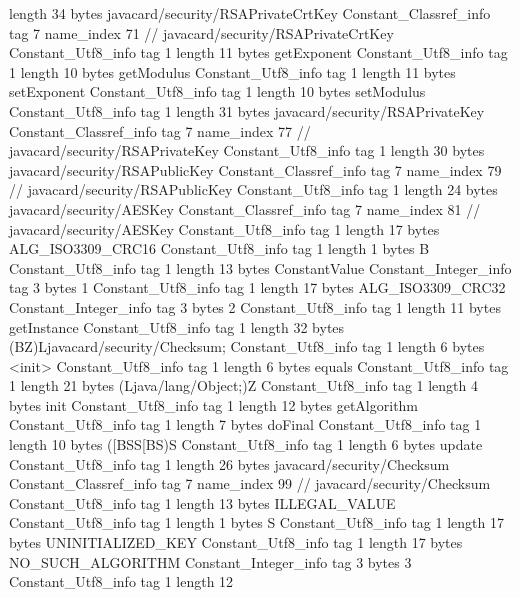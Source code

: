 {{{			length	34
			bytes	javacard/security/RSAPrivateCrtKey
		}
		Constant_Classref_info {
			tag	7
			name_index	71		// javacard/security/RSAPrivateCrtKey
		}
		Constant_Utf8_info {
			tag	1
			length	11
			bytes	getExponent
		}
		Constant_Utf8_info {
			tag	1
			length	10
			bytes	getModulus
		}
		Constant_Utf8_info {
			tag	1
			length	11
			bytes	setExponent
		}
		Constant_Utf8_info {
			tag	1
			length	10
			bytes	setModulus
		}
		Constant_Utf8_info {
			tag	1
			length	31
			bytes	javacard/security/RSAPrivateKey
		}
		Constant_Classref_info {
			tag	7
			name_index	77		// javacard/security/RSAPrivateKey
		}
		Constant_Utf8_info {
			tag	1
			length	30
			bytes	javacard/security/RSAPublicKey
		}
		Constant_Classref_info {
			tag	7
			name_index	79		// javacard/security/RSAPublicKey
		}
		Constant_Utf8_info {
			tag	1
			length	24
			bytes	javacard/security/AESKey
		}
		Constant_Classref_info {
			tag	7
			name_index	81		// javacard/security/AESKey
		}
		Constant_Utf8_info {
			tag	1
			length	17
			bytes	ALG_ISO3309_CRC16
		}
		Constant_Utf8_info {
			tag	1
			length	1
			bytes	B
		}
		Constant_Utf8_info {
			tag	1
			length	13
			bytes	ConstantValue
		}
		Constant_Integer_info {
			tag	3
			bytes	1
		}
		Constant_Utf8_info {
			tag	1
			length	17
			bytes	ALG_ISO3309_CRC32
		}
		Constant_Integer_info {
			tag	3
			bytes	2
		}
		Constant_Utf8_info {
			tag	1
			length	11
			bytes	getInstance
		}
		Constant_Utf8_info {
			tag	1
			length	32
			bytes	(BZ)Ljavacard/security/Checksum;
		}
		Constant_Utf8_info {
			tag	1
			length	6
			bytes	<init>
		}
		Constant_Utf8_info {
			tag	1
			length	6
			bytes	equals
		}
		Constant_Utf8_info {
			tag	1
			length	21
			bytes	(Ljava/lang/Object;)Z
		}
		Constant_Utf8_info {
			tag	1
			length	4
			bytes	init
		}
		Constant_Utf8_info {
			tag	1
			length	12
			bytes	getAlgorithm
		}
		Constant_Utf8_info {
			tag	1
			length	7
			bytes	doFinal
		}
		Constant_Utf8_info {
			tag	1
			length	10
			bytes	([BSS[BS)S
		}
		Constant_Utf8_info {
			tag	1
			length	6
			bytes	update
		}
		Constant_Utf8_info {
			tag	1
			length	26
			bytes	javacard/security/Checksum
		}
		Constant_Classref_info {
			tag	7
			name_index	99		// javacard/security/Checksum
		}
		Constant_Utf8_info {
			tag	1
			length	13
			bytes	ILLEGAL_VALUE
		}
		Constant_Utf8_info {
			tag	1
			length	1
			bytes	S
		}
		Constant_Utf8_info {
			tag	1
			length	17
			bytes	UNINITIALIZED_KEY
		}
		Constant_Utf8_info {
			tag	1
			length	17
			bytes	NO_SUCH_ALGORITHM
		}
		Constant_Integer_info {
			tag	3
			bytes	3
		}
		Constant_Utf8_info {
			tag	1
			length	12
}}}
